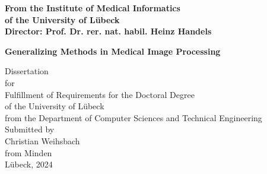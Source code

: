 \begin{titlepage}

    \addtolength{\topmargin}{-1.2cm}
    \addtolength{\textwidth}{2.35cm}

    \vspace*{-2.7cm}
    \vspace*{0.4cm}

    \begin{center}


        \enlargethispage{5cm}
        \textbf{From the Institute of Medical Informatics}\\
        \textbf{of the University of Lübeck}\\
        \textbf{Director: Prof. Dr. rer. nat. habil. Heinz Handels}\\[2.8cm]
        \begin{Large}
            \textbf{Generalizing Methods in Medical Image Processing}\\ %
        \end{Large}

        \vspace*{2.5cm}

        Dissertation\\
        for\\
        Fulfillment of Requirements for the Doctoral Degree\\
        of the University of Lübeck\\[1.0cm]
        from the Department of Computer Sciences and Technical Engineering\\[1.0cm]
        Submitted by\\[0.1cm]
        Christian Weihsbach\\[0.1cm]
        from Minden\\[3.0cm]
        Lübeck, 2024
        \end{center}


    \newpage
    \thispagestyle{empty}

    \addtolength{\topmargin}{1.2cm}
    \addtolength{\textwidth}{-2.35cm}
\end{titlepage}

